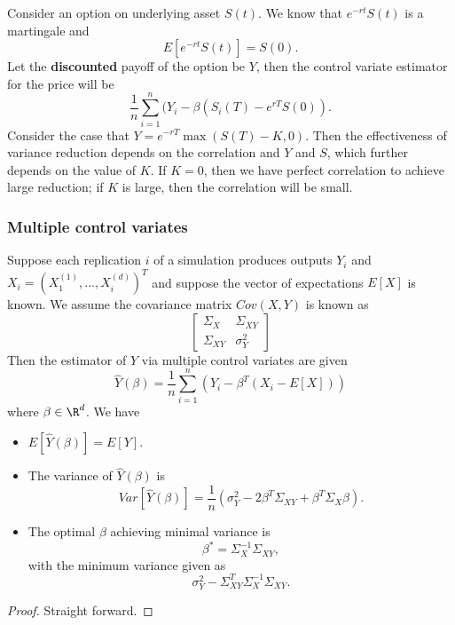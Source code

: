 \begin{refsection}
\begin{example}\cite[188]{glasserman2003monte} Consider an option on underlying asset $S(t)$. We know that $e^{-rt}S(t)$ is a martingale and $$E[e^{-rt}S(t)] = S(0).$$
	Let the \textbf{discounted} payoff of the option be $Y$, then the control variate estimator for the price will be
	$$\frac{1}{n}\sum_{i=1}^n (Y_i - \beta(S_i(T) - e^{rT}S(0)).$$
	Consider the case that $Y = e^{-rT}\max(S(T)-K,0)$. Then the effectiveness of variance reduction depends on the correlation and $Y$ and $S$, which further depends on the value of $K$. If $K = 0$, then we have perfect correlation to achieve large reduction; if $K$ is large, then the correlation will be small.
\end{example}



\subsubsection{Multiple control variates}

\begin{lemma}\cite[196]{glasserman2003monte}
	Suppose each replication $i$ of a simulation produces outputs $Y_i $ and $X_i = (X_1^{(1)},...,X_i^{(d)})^T$ and suppose the vector of expectations $E[X]$ is known. We assume the covariance matrix $Cov(X,Y)$ is known as
	$$\begin{bmatrix}
	\Sigma_X & \Sigma_{XY}\\
	\Sigma_{XY} & \sigma_Y^2
	\end{bmatrix}$$
	Then the estimator of $Y$ via multiple control variates are given 
	$$\hat{Y}(\beta) = \frac{1}{n}\sum_{i=1}^n (Y_i - \beta^T (X_i - E[X]))$$
	where $\beta\in \R^d$. 
	We have 
	\begin{itemize}
		\item $E[\hat{Y}(\beta)] = E[Y]$.
		\item The variance of $\hat{Y}(\beta)$ is
		$$Var[\hat{Y}(\beta)] = \frac{1}{n}(\sigma^2_Y - 2\beta^T\Sigma_{XY} + \beta^T\Sigma_{X}\beta).$$
		\item The optimal $\beta$ achieving minimal variance is
		$$\beta^* = \Sigma_X^{-1}\Sigma_{XY},$$
		with the minimum variance given as
		$$\sigma_Y^2 - \Sigma_{XY}^T \Sigma_X^{-1}\Sigma_{XY}.$$
	\end{itemize}
	
\end{lemma}
\begin{proof}
	Straight forward.
\end{proof}




\end{refsection}
